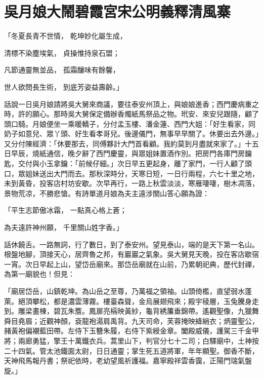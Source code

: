 %

\chapter{吳月娘大鬧碧霞宮\KG 宋公明義釋清風寨}


\begin{showcontents}{}



「冬夏長青不世情，  乾坤妙化屬生成，

清標不染塵埃氣，  貞操惟持泉石盟；

凡節通靈無並品，  孤霜釀味有餘馨，

世人欲問長生術，  到底芳姿益壽齡。」

話說一日吳月娘請將吳大舅來商議，要往泰安州頂上，與娘娘進香；西門慶病重之時，許的願心。那時吳大舅保定備辦香燭紙馬祭品之物。玳安、來安兒跟隨，顧了頭口騎。月娘便坐一乘暖轎子，分付孟玉樓、潘金蓮、西門大姐：「好生看家，同奶子如意兒、眾丫頭、好生看孝哥兒。後邊儀門，無事早早關了。休要出去外邊。」又分付陳經濟：「休要那去，同傅夥計大門首看顧。我約莫到月盡就來家了。」十五日早辰，燒紙通信，晚夕辭了西門慶靈，與眾姐妹置酒作別。把房門各庫門房鑰匙，交付與小玉拿鑰：「前候仔細。」次日早五更起身，離了家門，一行人顧了頭口，眾姐妹送出大門而去。那秋深時分，天寒日短，一日行兩程，六七十里之地，未到黃昏，投客店村坊安歇。次早再行，一路上秋雲淡淡，寒雁啛啛，樹木凋落，景物荒凉，不勝悲愴。有詩單道月娘為夫主遠涉關山答心願為證：

「平生志節傲冰霜，  一點真心格上蒼；

為夫遠許神州願，  千里關山姓字香。」

話休饒舌。一路無詞，行了數日，到了泰安州。望見泰山，端的是天下第一名山。根盤地腳，頂接天心，居齊魯之邦，有巖巖之氣象。吳大舅見天晚，投在客店歇宿一宵。次日早起上山，望岱岳廟來。那岱岳廟就在山前，乃累朝祀典，歷代封禪，為第一廟貌也！但見：

「廟居岱岳，山鎮乾坤。為山岳之至尊，乃萬福之領袖。山頭倚檻，直望弱水蓬萊。絕頂攀松，都是濃雲薄霧。樓臺森聳，金烏展翅飛來；殿宇稜層，玉兔騰身走到。雕梁畫棟，碧瓦朱簷。鳳扉亮槅映黃紗，龜背綉簾垂錦帶。遙觀聖像，九獵舞舜目堯眉；近觀神顏，袞龍袍湯肩禹背。九天司命，芙蓉掩映絳綃衣；炳靈聖公，赭黃袍偏襯藍田帶。左侍下玉簪朱履，右侍下紫綬金章。闔殿威儀，護駕三千金甲將；兩廊勇猛，擎王十萬鐵衣兵。蒿里山下，判官分七十二司；白驛廟中，土神按二十四氣。管太池鐵面太尉，日日通靈；掌生死五道將軍，年年顯聖。御香不斷，天神飛馬報丹書；祭祀依時，老幼望風祈護福。嘉寧殿祥雲香靄，正陽門瑞氣盤旋。」


\end{showcontents}
